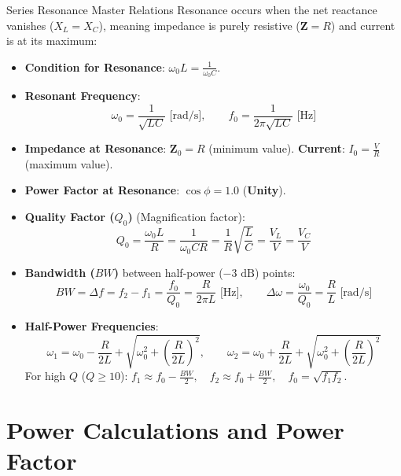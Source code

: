 \begin{formulabox}{Series Resonance Master Relations}
Resonance occurs when the net reactance vanishes ($X_L = X_C$), meaning impedance is purely resistive ($\mathbf{Z} = R$) and current is at its maximum:
\begin{itemize}[leftmargin=1.5em]
    \item \textbf{Condition for Resonance}: $\omega_0 L = \frac{1}{\omega_0 C}$.
    \item \textbf{Resonant Frequency}:
    \[ \omega_0 = \frac{1}{\sqrt{LC}} \text{ [rad/s]}, \qquad f_0 = \frac{1}{2\pi\sqrt{LC}} \text{ [Hz]} \]
    \item \textbf{Impedance at Resonance}: $\mathbf{Z}_0 = R$ (minimum value). \quad \textbf{Current}: $I_0 = \frac{V}{R}$ (maximum value).
    \item \textbf{Power Factor at Resonance}: $\cos\phi = 1.0$ (\textbf{Unity}).
    \item \textbf{Quality Factor ($Q_0$)} (Magnification factor):
    \[ Q_0 = \frac{\omega_0 L}{R} = \frac{1}{\omega_0 C R} = \frac{1}{R}\sqrt{\frac{L}{C}} = \frac{V_L}{V} = \frac{V_C}{V} \]
    \item \textbf{Bandwidth ($BW$)} between half-power ($-3\text{ dB}$) points:
    \[ BW = \Delta f = f_2 - f_1 = \frac{f_0}{Q_0} = \frac{R}{2\pi L} \text{ [Hz]}, \qquad \Delta \omega = \frac{\omega_0}{Q_0} = \frac{R}{L} \text{ [rad/s]} \]
    \item \textbf{Half-Power Frequencies}:
    \[ \omega_1 = \omega_0 - \frac{R}{2L} + \sqrt{\omega_0^2 + \left(\frac{R}{2L}\right)^2}, \qquad \omega_2 = \omega_0 + \frac{R}{2L} + \sqrt{\omega_0^2 + \left(\frac{R}{2L}\right)^2} \]
    For high $Q$ ($Q \ge 10$): $f_1 \approx f_0 - \frac{BW}{2}, \quad f_2 \approx f_0 + \frac{BW}{2}, \quad f_0 = \sqrt{f_1 f_2}$.
\end{itemize}
\end{formulabox}

\section{Power Calculations and Power Factor}

